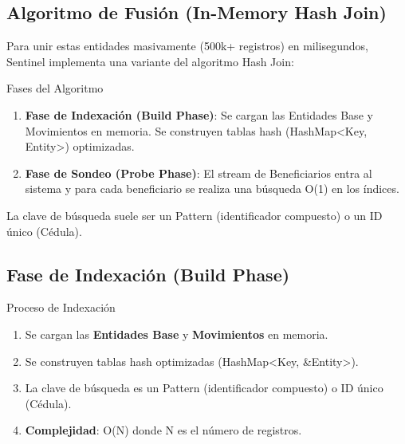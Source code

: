 \subsection{Algoritmo de Fusión (In-Memory Hash Join)}

Para unir estas entidades masivamente (500k+ registros) en milisegundos, Sentinel implementa una variante del algoritmo Hash Join:


\begin{caja}{Fases del Algoritmo}
\begin{enumerate}
\item \textbf{Fase de Indexación (Build Phase)}: Se cargan las Entidades Base y Movimientos en memoria. Se construyen tablas hash (HashMap<Key, Entity>) optimizadas.
\item \textbf{Fase de Sondeo (Probe Phase)}: El stream de Beneficiarios entra al sistema y para cada beneficiario se realiza una búsqueda O(1) en los índices.
\end{enumerate}
\end{caja}


La clave de búsqueda suele ser un Pattern (identificador compuesto) o un ID único (Cédula).


\subsection{Fase de Indexación (Build Phase)}

\begin{caja}{Proceso de Indexación}
\begin{enumerate}
\item Se cargan las \textbf{Entidades Base} y \textbf{Movimientos} en memoria.
\item Se construyen tablas hash optimizadas (HashMap<Key, \&Entity>).
\item La clave de búsqueda es un Pattern (identificador compuesto) o ID único (Cédula).
\item \textbf{Complejidad}: O(N) donde N es el número de registros.
\end{enumerate}
\end{caja}


